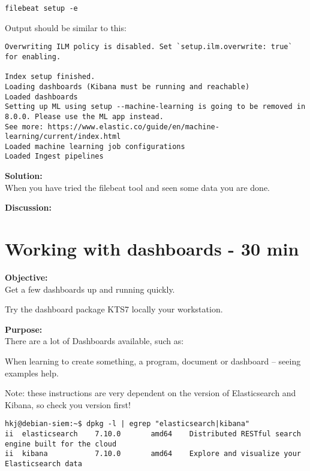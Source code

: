 \documentclass[a4paper,11pt,notitlepage]{report}
\begin{document}
\begin{verbatim}
filebeat setup -e
\end{verbatim}

Output should be similar to this:
\begin{verbatim}
Overwriting ILM policy is disabled. Set `setup.ilm.overwrite: true` for enabling.

Index setup finished.
Loading dashboards (Kibana must be running and reachable)
Loaded dashboards
Setting up ML using setup --machine-learning is going to be removed in 8.0.0. Please use the ML app instead.
See more: https://www.elastic.co/guide/en/machine-learning/current/index.html
Loaded machine learning job configurations
Loaded Ingest pipelines
\end{verbatim}


{\bf Solution:}\\
When you have tried the filebeat tool and seen some data you are done.

{\bf Discussion:}\\



\chapter{Working with dashboards - 30 min}
\label{ex:kibana-kts}

{\bf Objective:}\\
Get a few dashboards up and running quickly.

Try the dashboard package KTS7 locally your workstation.


{\bf Purpose:}\\
There are a lot of Dashboards available, such as:\\

When learning to create something, a program, document or dashboard -- seeing examples help.

Note: these instructions are very dependent on the version of Elasticsearch and Kibana, so check you version first!
\begin{verbatim}
hkj@debian-siem:~$ dpkg -l | egrep "elasticsearch|kibana"
ii  elasticsearch    7.10.0       amd64    Distributed RESTful search engine built for the cloud
ii  kibana           7.10.0       amd64    Explore and visualize your Elasticsearch data
\end{verbatim}
\end{document}

